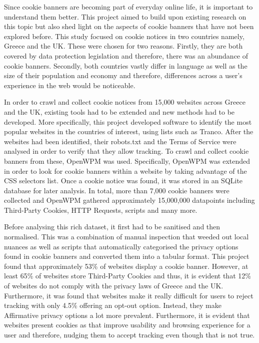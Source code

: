 \documentclass[../main.tex]{subfiles}
\begin{document}
Since cookie banners are becoming part of everyday online life, it is important to understand them better. This project aimed to build upon existing research on this topic but also shed light on the aspects of cookie banners that have not been explored before. This study focused on cookie notices in two countries namely, Greece and the UK. These were chosen for two reasons. Firstly, they are both covered by data protection legislation and therefore, there was an abundance of cookie banners. Secondly, both countries vastly differ in language as well as the size of their population and economy and therefore, differences across a user’s experience in the web would be noticeable.

In order to crawl and collect cookie notices from 15,000 websites across Greece and the UK, existing tools had to be extended and new methods had to be developed. More specifically, this project developed software to identify the most popular websites in the countries of interest, using lists such as Tranco. After the websites had been identified, their robots.txt and the Terms of Service were analysed in order to verify that they allow tracking. To crawl and collect cookie banners from these, OpenWPM was used. Specifically, OpenWPM was extended in order to look for cookie banners within a website by taking advantage of the  CSS selectors list. Once a cookie notice was found, it was stored in an SQLite database for later analysis. In total, more than 7,000 cookie banners were collected and OpenWPM gathered approximately 15,000,000 datapoints including Third-Party Cookies, HTTP Requests, scripts and many more. 

Before analysing this rich dataset, it first had to be sanitised and then normalised. This was a combination of manual inspection that weeded out local nuances as well as scripts that automatically categorised the privacy options found in cookie banners and converted them into a tabular format. This project found that approximately 53\% of websites display a cookie banner. However, at least 65\% of websites store Third-Party Cookies and thus, it is evident that 12\% of websites do not comply with the privacy laws of Greece and the UK. Furthermore, it was found that websites make it really difficult for users to reject tracking with only 4.5\% offering an opt-out option. Instead, they make Affirmative privacy options a lot more prevalent. Furthermore, it is evident that websites present cookies as  that improve usability and browsing experience for a user and therefore, nudging them to accept tracking even though that is not true. 
\end{document}
